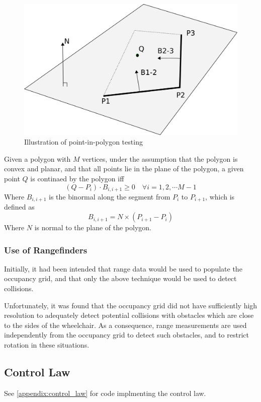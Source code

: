 \documentclass[oneside,final,a4paper]{report}
\begin{document}
\begin{figure}
 \centering
 \includegraphics[scale=0.9]{point-in-poly}
 \caption{Illustration of point-in-polygon testing}
 \label{fig:point-in-poly}
\end{figure}

Given a polygon with $M$ vertices, under the assumption that the polygon is convex and planar, and that all points lie in the plane of the polygon, a given point $Q$ is continaed by the polygon iff 
\begin{equation}
 (Q-P_i) \cdot B_{i,i+1} \ge 0 \quad \forall i = 1, 2, \cdots M-1
\end{equation}
Where $B_{i,i+1}$ is the binormal along the segment from $P_i$ to $P_{i+1}$, which is defined as
\begin{equation}
 B_{i,i+1} = N \times (P_{i+1} - P_{i})
\end{equation}
Where $N$ is normal to the plane of the polygon.

\subsubsection{Use of Rangefinders}
Initially, it had been intended that range data would be used to populate the occupancy grid, and that only the above technique would be used to detect collisions.  

Unfortunately, it was found that the occupancy grid did not have sufficiently high resolution to adequately detect potential collisions with obstacles which are close to the sides of the wheelchair.  As a consequence, range measurements are used independently from the occupancy grid to detect such obstacles, and to restrict rotation in these situations.

\subsection{Control Law}
See \ref{appendix:control_law} for code implmenting the control law.
\end{document}
